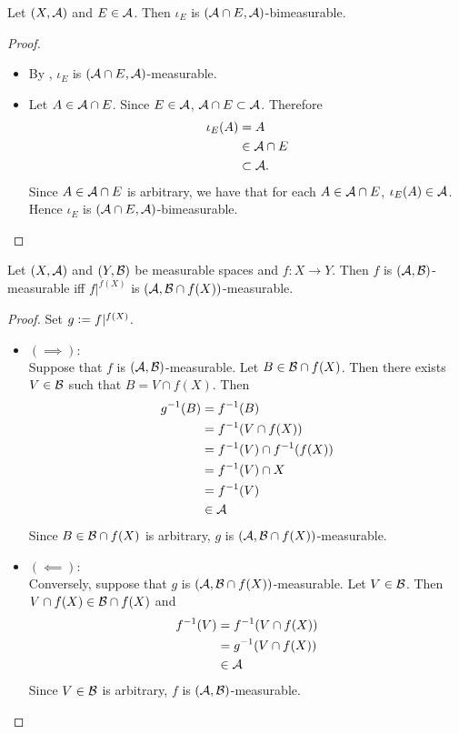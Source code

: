 \documentclass{book}
\begin{document}
	\begin{ex} 
		Let $(X, \mathcal{A})$ and $E \in \mathcal{A}$. Then $\iota_E$ is $(\mathcal{A} \cap E, \mathcal{A})$-bimeasurable.
	\end{ex}
	
	\begin{proof}\
		\begin{itemize}
			\item By , $\iota_E$ is $(\mathcal{A} \cap E, \mathcal{A})$-measurable.
			\item Let $A \in \mathcal{A} \cap E$. Since $E \in \mathcal{A}$, $\mathcal{A} \cap E \subset \mathcal{A}$. Therefore
			\begin{align*}
				\iota_E(A)
				& = A \\
				& \in \mathcal{A} \cap E \\
				& \subset \mathcal{A}.
			\end{align*}
			Since $A \in \mathcal{A} \cap E$ is arbitrary, we have that for each $A \in \mathcal{A} \cap E$, $\iota_E(A) \in \mathcal{A}$. Hence $\iota_E$ is $(\mathcal{A} \cap E, \mathcal{A})$-bimeasurable.
		\end{itemize}
	\end{proof}

	\begin{ex} 
		Let $(X, \mathcal{A})$ and $(Y, \mathcal{B})$ be measurable spaces and $f:X \rightarrow Y$. Then $f$ is $(\mathcal{A}, \mathcal{B})$-measurable iff $f|^{f(X)}$ is $(\mathcal{A}, \mathcal{B} \cap f(X))$-measurable.
	\end{ex}
	
	\begin{proof}
		Set $g \vcentcolon= f|^{f(X)}$.
		\begin{itemize}
			\item $(\implies):$ \\
			Suppose that $f$ is $(\mathcal{A}, \mathcal{B})$-measurable. Let $B \in \mathcal{B} \cap f(X)$. Then there exists $V \in \mathcal{B}$ such that $B = V \cap f(X)$. Then 
			\begin{align*}
				g^{-1}(B)
				& = f^{-1}(B) \\
				& = f^{-1}(V \cap f(X)) \\
				& = f^{-1}(V) \cap f^{-1}(f(X)) \\
				& = f^{-1}(V) \cap X \\
				& = f^{-1}(V) \\
				& \in \mathcal{A}
			\end{align*}
			Since $B \in \mathcal{B} \cap f(X)$ is arbitrary, $g$ is  $(\mathcal{A}, \mathcal{B} \cap f(X))$-measurable. 
			\item $(\impliedby):$ \\
			Conversely, suppose that $g$ is  $(\mathcal{A}, \mathcal{B} \cap f(X))$-measurable. Let $V \in \mathcal{B}$. Then $V \cap f(X) \in \mathcal{B} \cap f(X)$ and 
			\begin{align*}
				f^{-1}(V)
				& = f^{-1}(V \cap f(X)) \\
				& = g^{-1}(V \cap f(X)) \\
				& \in \mathcal{A}  
			\end{align*} 
			Since $V \in \mathcal{B}$ is arbitrary, $f$ is  $(\mathcal{A}, \mathcal{B})$-measurable. 
		\end{itemize}
	\end{proof}
\end{document}
